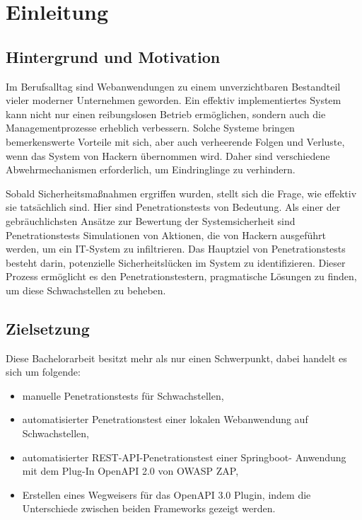 \chapter{Einleitung}
\label{cha:Einleitung}

\section{Hintergrund und Motivation}

Im Berufsalltag sind Webanwendungen zu einem unverzichtbaren Bestandteil vieler moderner Unternehmen geworden. Ein effektiv implementiertes System kann nicht nur einen reibungslosen Betrieb ermöglichen, sondern auch die Managementprozesse erheblich verbessern. Solche Systeme bringen bemerkenswerte Vorteile mit sich, aber auch verheerende Folgen und Verluste, wenn das System von Hackern übernommen wird. Daher sind verschiedene Abwehrmechanismen erforderlich, um Eindringlinge zu verhindern.

Sobald Sicherheitsmaßnahmen ergriffen wurden, stellt sich die Frage, wie effektiv sie tatsächlich sind. Hier sind Penetrationstests von Bedeutung. Als einer der gebräuchlichsten Ansätze zur Bewertung der Systemsicherheit sind Penetrationstests Simulationen von Aktionen, die von Hackern ausgeführt werden, um ein IT-System zu infiltrieren. Das Hauptziel von Penetrationstests besteht darin, potenzielle Sicherheitslücken im System zu identifizieren. Dieser Prozess ermöglicht es den Penetrationstestern, pragmatische Lösungen zu finden, um diese Schwachstellen zu beheben.

\section{Zielsetzung}

Diese Bachelorarbeit besitzt mehr als nur einen Schwerpunkt, dabei handelt es sich um folgende:

\begin{itemize}
	\item manuelle Penetrationstests für Schwachstellen,
	\item automatisierter Penetrationstest einer lokalen Webanwendung auf Schwachstellen,
	\item automatisierter REST-API-Penetrationstest einer Springboot- Anwendung mit dem Plug-In OpenAPI 2.0 von OWASP ZAP,
	\item Erstellen eines Wegweisers für das OpenAPI 3.0 Plugin, indem die Unterschiede zwischen beiden Frameworks gezeigt werden.\\
\end{itemize}

